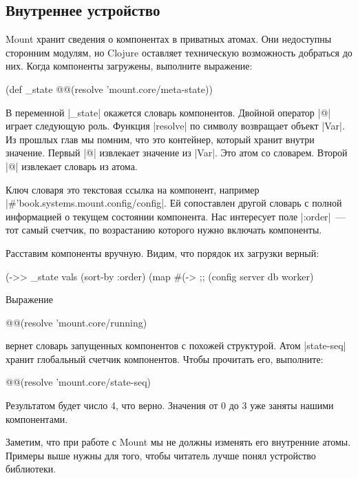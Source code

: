 \subsection{Внутреннее устройство}

Mount хранит сведения о компонентах в приватных атомах. Они недоступны сторонним
модулям, но Clojure оставляет техническую возможность добраться до них. Когда
компоненты загружены, выполните выражение:

\begin{code}
(def _state @@(resolve 'mount.core/meta-state))
\end{code}

В переменной \spverb|_state| окажется словарь компонентов. Двойной оператор \spverb|@| играет
следующую роль. Функция \spverb|resolve| по символу возвращает объект \spverb|Var|. Из прошлых
глав мы помним, что это контейнер, который хранит внутри значение. Первый \spverb|@|
извлекает значение из \spverb|Var|. Это атом со словарем. Второй \spverb|@| извлекает словарь
из атома.

Ключ словаря это текстовая ссылка на компонент, например
\spverb|#'book.systems.mount.config/config|. Ей сопоставлен другой словарь с полной
информацией о текущем состоянии компонента. Нас интересует поле \spverb|:order|~--- тот
самый счетчик, по возрастанию которого нужно включать компоненты.

Расставим компоненты вручную. Видим, что порядок их загрузки верный:

\begin{code}
(->> _state
     vals
     (sort-by :order)
     (map #(-> %
;; (config server db worker)
\end{code}

Выражение

\begin{code}
@@(resolve 'mount.core/running)
\end{code}

вернет словарь запущенных компонентов с похожей структурой. Атом \spverb|state-seq|
хранит глобальный счетчик компонентов. Чтобы прочитать его, выполните:

\begin{code}
@@(resolve 'mount.core/state-seq)
\end{code}

Результатом будет число 4, что верно. Значения от 0 до 3 уже заняты нашими
компонентами.

Заметим, что при работе с Mount мы не должны изменять его внутренние
атомы. Примеры выше нужны для того, чтобы читатель лучше понял устройство
библиотеки.

